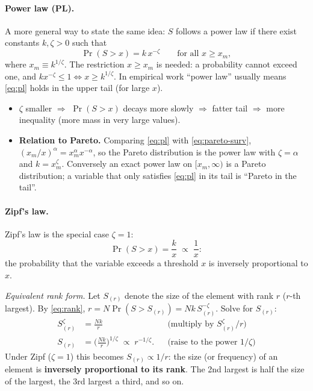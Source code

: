 \paragraph{Power law (PL).} A more general way to state the same idea: $S$ follows a power law if there exist constants $k,\zeta>0$ such that
\begin{equation}\label{eq:pl}
  \Pr(S>x)=k\,x^{-\zeta}\qquad\text{for all } x\ge x_m,
\end{equation}
where $x_m\equiv k^{1/\zeta}$. The restriction $x\ge x_m$ is needed: a probability cannot exceed one, and $kx^{-\zeta}\le1\iff x\ge k^{1/\zeta}$. In empirical work ``power law'' usually means \eqref{eq:pl} holds in the upper tail (for large $x$).
\begin{itemize}
  \item $\zeta$ smaller $\Rightarrow$ $\Pr(S>x)$ decays more slowly $\Rightarrow$ fatter tail $\Rightarrow$ more inequality (more mass in very large values).
  \item \textbf{Relation to Pareto.} Comparing \eqref{eq:pl} with \eqref{eq:pareto-surv}, $(x_m/x)^\alpha=x_m^\alpha x^{-\alpha}$, so the Pareto distribution is the power law with $\zeta=\alpha$ and $k=x_m^{\zeta}$. Conversely an exact power law on $[x_m,\infty)$ is a Pareto distribution; a variable that only satisfies \eqref{eq:pl} in its tail is ``Pareto in the tail''.
\end{itemize}

\paragraph{Zipf's law.} Zipf's law is the special case $\zeta=1$:
\begin{equation*}
  \Pr(S>x)=\frac{k}{x}\;\propto\;\frac1x :
\end{equation*}
the probability that the variable exceeds a threshold $x$ is inversely proportional to $x$.

\emph{Equivalent rank form.} Let $S_{(r)}$ denote the size of the element with rank $r$ ($r$-th largest). By \eqref{eq:rank}, $r=N\Pr(S>S_{(r)})=N k\,S_{(r)}^{-\zeta}$. Solve for $S_{(r)}$:
\begin{align*}
  S_{(r)}^{\zeta}&=\frac{Nk}{r} &&\text{(multiply by }S_{(r)}^{\zeta}/r\text{)}\\
  S_{(r)}&=\Big(\frac{Nk}{r}\Big)^{1/\zeta}\;\propto\;r^{-1/\zeta}. &&\text{(raise to the power }1/\zeta\text{)}
\end{align*}
Under Zipf ($\zeta=1$) this becomes $S_{(r)}\propto 1/r$: the size (or frequency) of an element is \textbf{inversely proportional to its rank}. The 2nd largest is half the size of the largest, the 3rd largest a third, and so on.


